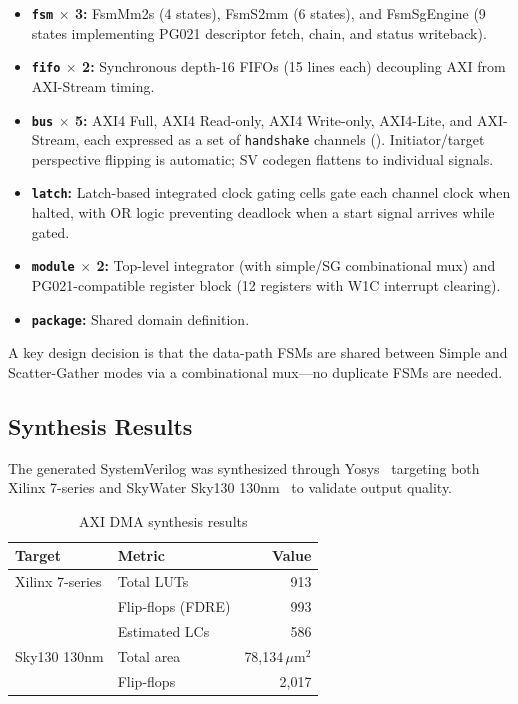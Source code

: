 \documentclass[manuscript]{acmart}
\begin{document}
\begin{itemize}
\item \textbf{\texttt{fsm} $\times$ 3:} FsmMm2s (4 states), FsmS2mm (6 states), and FsmSgEngine (9 states implementing PG021 descriptor fetch, chain, and status writeback).
\item \textbf{\texttt{fifo} $\times$ 2:} Synchronous depth-16 FIFOs (15 lines each) decoupling AXI from AXI-Stream timing.
\item \textbf{\texttt{bus} $\times$ 5:} AXI4 Full, AXI4 Read-only, AXI4 Write-only, AXI4-Lite, and AXI-Stream, each expressed as a set of \texttt{handshake} channels (). Initiator/target perspective flipping is automatic; SV codegen flattens to individual signals.
\item \textbf{\texttt{latch}:} Latch-based integrated clock gating cells gate each channel clock when halted, with OR logic preventing deadlock when a start signal arrives while gated.
\item \textbf{\texttt{module} $\times$ 2:} Top-level integrator (with simple/SG combinational mux) and PG021-compatible register block (12 registers with W1C interrupt clearing).
\item \textbf{\texttt{package}:} Shared domain definition.
\end{itemize}

A key design decision is that the data-path FSMs are shared between Simple and Scatter-Gather modes via a combinational mux---no duplicate FSMs are needed.

\subsection{Synthesis Results}

The generated SystemVerilog was synthesized through Yosys~\cite{yosys} targeting both Xilinx 7-series and SkyWater Sky130 130nm~\cite{sky130pdk} to validate output quality.

\begin{table}[H]
\centering
\caption{AXI DMA synthesis results}
\label{tab:dmasyn}
\footnotesize
\begin{tabular}{@{}llr@{}}
\toprule
\textbf{Target} & \textbf{Metric} & \textbf{Value} \\
\midrule
Xilinx 7-series & Total LUTs & 913 \\
                & Flip-flops (FDRE) & 993 \\
                & Estimated LCs & 586 \\
\midrule
Sky130 130nm    & Total area & 78,134\,$\mu$m$^2$ \\
                & Flip-flops & 2,017 \\
\bottomrule
\end{tabular}
\end{table}
\end{document}
